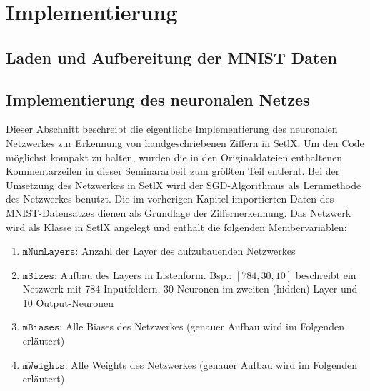 \chapter{Implementierung}

\section{Laden und Aufbereitung der MNIST Daten}

\section{Implementierung des neuronalen Netzes}
Dieser Abschnitt beschreibt die eigentliche Implementierung des neuronalen Netzwerkes zur Erkennung von handgeschriebenen Ziffern in SetlX. Um den Code möglichst kompakt zu halten, wurden die in den Originaldateien enthaltenen Kommentarzeilen in dieser Seminararbeit zum größten Teil entfernt.
Bei der Umsetzung des Netzwerkes in SetlX wird der SGD-Algorithmus als Lernmethode des Netzwerkes benutzt. Die im vorherigen Kapitel importierten Daten des MNIST-Datensatzes dienen als Grundlage der Ziffernerkennung. 
Das Netzwerk wird als Klasse in SetlX angelegt und enthält die folgenden Membervariablen:

\begin{enumerate}
\item $\mathtt{mNumLayers}$: Anzahl der Layer des aufzubauenden Netzwerkes 
\item $\mathtt{mSizes}$: Aufbau des Layers in Listenform. Bsp.: $[784, 30, 10]$ beschreibt ein Netzwerk mit 784 Inputfeldern, 30 Neuronen im zweiten (hidden) Layer und 10 Output-Neuronen
\item $\mathtt{mBiases}$: Alle Biases des Netzwerkes (genauer Aufbau wird im Folgenden erläutert)
\item $\mathtt{mWeights}$: Alle Weights des Netzwerkes (genauer Aufbau wird im Folgenden erläutert)
\end{enumerate}

